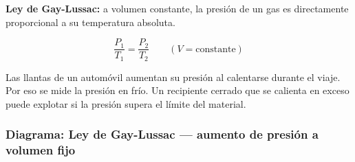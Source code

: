 \begin{seccion}
\begin{definicion}
\textbf{Ley de Gay-Lussac:} a volumen constante, la presión de un gas es directamente proporcional a su temperatura absoluta.
\end{definicion}

\begin{ecuacion}
$$\frac{P_1}{T_1} = \frac{P_2}{T_2} \qquad (V = \text{constante})$$
\end{ecuacion}

\begin{nota}
Las llantas de un automóvil aumentan su presión al calentarse durante el viaje. Por eso se mide la presión en frío. Un recipiente cerrado que se calienta en exceso puede explotar si la presión supera el límite del material.
\end{nota}
\end{seccion}

\subsubsection{Diagrama: Ley de Gay-Lussac --- aumento de presión a volumen fijo}

